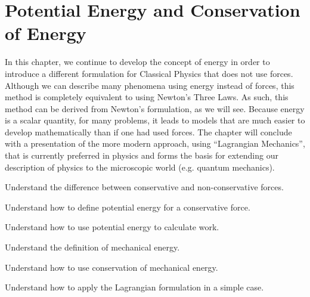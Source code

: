 
\chapter{Potential Energy and Conservation of Energy}
\label{chapter:potentialecons}
In this chapter, we continue to develop the concept of energy in order to introduce a different formulation for Classical Physics that does not use forces. Although we can describe many phenomena using energy instead of forces, this method is completely equivalent to using Newton's Three Laws. As such, this method can be derived from Newton's formulation, as we will see. Because energy is a scalar quantity, for many problems, it leads to models that are much easier to develop mathematically than if one had used forces. The chapter will conclude with a presentation of the more modern approach, using ``Lagrangian Mechanics'', that is currently preferred in physics and forms the basis for extending our description of physics to the microscopic world (e.g. quantum mechanics). 

\begin{learningObjectives}{
 \item Understand the difference between conservative and non-conservative forces.
 \item Understand how to define potential energy for a conservative force.
 \item Understand how to use potential energy to calculate work.
 \item Understand the definition of mechanical energy.
 \item Understand how to use conservation of mechanical energy.
 \item Understand how to apply the Lagrangian formulation in a simple case.
 }
\end{learningObjectives}

